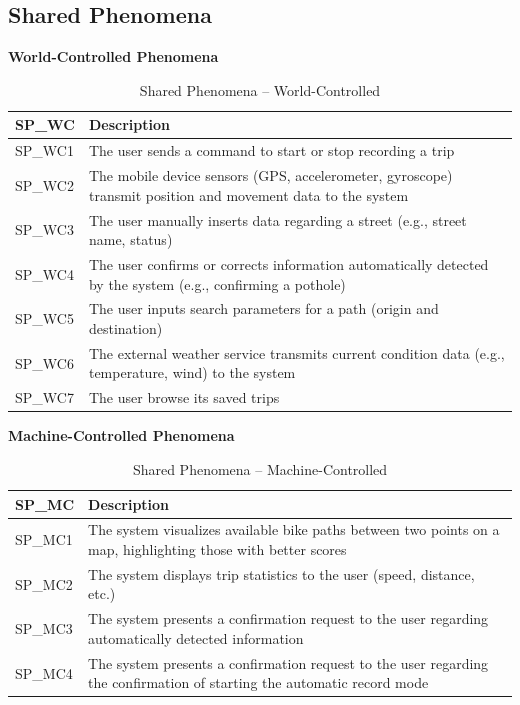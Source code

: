 \subsection{Shared Phenomena}
\textbf{World-Controlled Phenomena}
\begin{table}[H]
\centering
\begin{tabularx}{\linewidth}{|l|X|}
\hline
\textbf{SP\_WC} & \textbf{Description} \\ \hline
SP\_WC1 & The user sends a command to start or stop recording a trip \\ \hline
SP\_WC2 & The mobile device sensors (GPS, accelerometer, gyroscope) transmit position and movement data to the system \\ \hline
SP\_WC3 & The user manually inserts data regarding a street (e.g., street name, status) \\ \hline
SP\_WC4 & The user confirms or corrects information automatically detected by the system (e.g., confirming a pothole) \\ \hline
SP\_WC5 & The user inputs search parameters for a path (origin and destination) \\ \hline
SP\_WC6 & The external weather service transmits current condition data (e.g., temperature, wind) to the system \\ \hline
SP\_WC7 & The user browse its saved trips \\ \hline
\end{tabularx}
\caption{Shared Phenomena -- World-Controlled}
\label{tab:shared-sp-wc}
\end{table}


\textbf{Machine-Controlled Phenomena}
\begin{table}[H]
\centering
\begin{tabularx}{\linewidth}{|l|X|}
\hline
\textbf{SP\_MC} & \textbf{Description} \\ \hline
SP\_MC1 & The system visualizes available bike paths between two points on a map, highlighting those with better scores \\ \hline
SP\_MC2 & The system displays trip statistics to the user (speed, distance, etc.) \\ \hline
SP\_MC3 & The system presents a confirmation request to the user regarding automatically detected information \\ \hline
SP\_MC4 & The system presents a confirmation request to the user regarding the confirmation of starting the automatic record mode\\ \hline

\end{tabularx}
\caption{Shared Phenomena -- Machine-Controlled}
\label{tab:shared-sp-mc}
\end{table}

